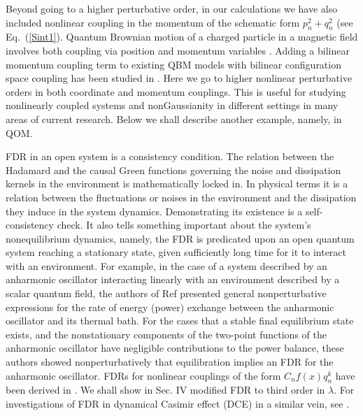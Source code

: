 \documentclass[%
amssymb,preprint,preprintnumbers,nofootinbib,superscriptaddress]{revtex4}
\begin{document}
Beyond going to a higher perturbative order, in our calculations we have also included nonlinear coupling in the momentum of the schematic form {$ p_{n}^2 + q_{n}^2$ (see Eq.~(\ref{Sint1})}. Quantum Brownian motion of a charged particle in a magnetic field involves both coupling via position and momentum variables \cite{SSinha}. Adding a bilinear momentum coupling term to existing QBM models with bilinear configuration space coupling has been studied in \cite{HuaZha22}.  Here we go to higher nonlinear perturbative orders in both coordinate and momentum couplings. This is useful for studying nonlinearly coupled systems and nonGaussianity in different settings in many areas of current research. Below we shall describe another example, namely, in QOM. 

\vskip 10pt

FDR in an open system  is a consistency condition. The relation between the Hadamard and the causal Green functions governing the noise and dissipation kernels in the environment is mathematically locked in. In physical terms it is a relation between the fluctuations or noises in the environment and the dissipation they induce  in the system dynamics. Demonstrating its existence is a self-consistency check. It also tells something important about  the system's nonequilibrium dynamics, namely, the FDR is  predicated upon an open quantum system reaching a stationary state, given sufficiently long time for it to interact with an environment.  For example, in the case of a system described by an anharmonic oscillator interacting linearly with an environment described by a scalar quantum field, the authors of Ref \cite{HHnlFDR} presented general nonperturbative expressions for the rate of energy (power) exchange between the anharmonic oscillator and its thermal bath. For the cases that a stable final equilibrium state exists, and the nonstationary components of the two-point functions of the anharmonic oscillator have negligible contributions to the power balance, these authors showed nonperturbatively that equilibration implies an FDR for the anharmonic oscillator.  FDRs for  nonlinear couplings of the form ${C_n f(x) q_n^k}$ have been derived in \cite{HPZ93}. We shall show in Sec. IV modified FDR  to third order in $\lambda$. For investigations of FDR in dynamical Casimir effect (DCE) in a similar vein, see \cite{But2M,ButND}.


\vskip 10pt
\end{document}
